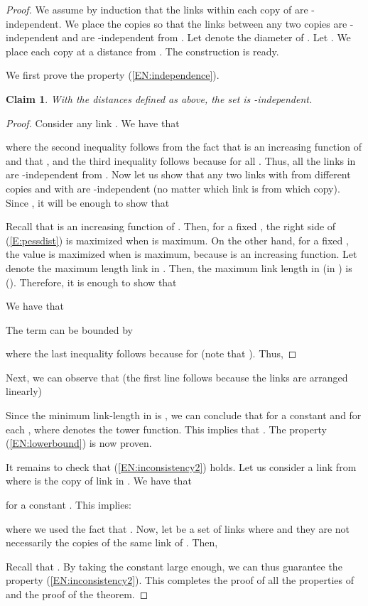\documentclass[11pt]{article}
\newtheorem{claim}{Claim}
\begin{document}
\begin{proof}
We assume by induction that the links within each copy of  are -independent. We place the copies  so that the links between any two copies are -independent and are -independent from . Let  denote the diameter of . 
Let . We place each copy  at a distance  from . The construction is ready.

We first prove the property (\ref{EN:independence}).
\begin{claim}
With the distances defined as above, the set  is -independent.
\end{claim}
\begin{proof}
Consider any link . We have that 

where the second inequality follows from the fact that  is an increasing function of  and that , and the third inequality follows because  for all . Thus, all the links in  are -independent from . Now let us show that any two links  with  from different copies  and  with  are -independent (no matter which link is from which copy). Since , it will be enough to show that

 Recall that  is an increasing function of . Then, for a fixed , the right side of (\ref{E:pessdist}) is maximized when  is maximum. On the other hand, for a fixed ,  the value  is maximized when  is maximum, because  is an increasing function. Let  denote the maximum length link in . Then, the maximum link length in  (in ) is  (). Therefore, it is enough to show that 

We have that

The term  can be bounded by

where the last inequality follows because  for  (note that ). Thus,

\end{proof}
Next, we can observe that (the first line follows because the links are arranged linearly) 

Since the minimum link-length in  is , we can conclude that  for a constant  and for each , where  denotes the tower function.
This implies that . The property (\ref{EN:lowerbound}) is now proven.

It remains to check that (\ref{EN:inconsistency2}) holds. Let us consider a link  from  where  is the copy of link  in . We have that

for a constant . This implies:

where we used the fact that .
Now, let   be a set of links where  and they are not necessarily the copies of the same link of . Then, 

Recall that . By taking the constant  large enough, we can thus guarantee the property (\ref{EN:inconsistency2}). This completes the proof of all the properties of  and the proof of the theorem.
\end{proof}
\end{document}
